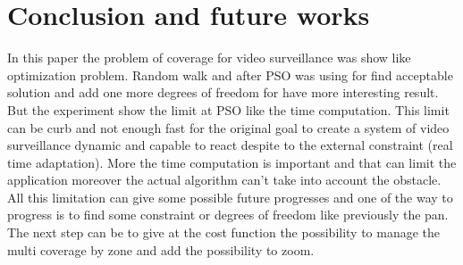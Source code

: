 \newpage

\section{Conclusion and future works}\label{sec:5}

In this paper the problem of coverage for video surveillance was show like optimization problem. Random walk and after PSO was using for find acceptable solution and add one more degrees of freedom for have more interesting result. But the experiment show the limit at PSO like the time computation. This limit can be curb and not enough fast for the original goal to create a system of video surveillance dynamic and capable to react despite to the external constraint (real time adaptation).
More the time computation is important and that can limit the application moreover the actual algorithm can’t take into account the obstacle. All this limitation can give some possible future progresses and one of the way to progress is to find some constraint or degrees of freedom like previously the pan. The next step can be to give at the cost function the possibility to manage the multi coverage by zone and add the possibility to zoom.


